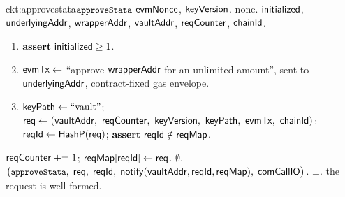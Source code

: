 \begin{CktBox}{ckt:approvestata}{$\texttt{\small approveStata}$}
 $\mathsf{evmNonce}$, $\mathsf{keyVersion}$.
 none.
 $\mathsf{initialized}$, $\mathsf{underlyingAddr}$, $\mathsf{wrapperAddr}$, $\mathsf{vaultAddr}$, $\mathsf{reqCounter}$, $\mathsf{chainId}$.
\begin{enumerate}[nosep,leftmargin=1.7em,topsep=2pt]
\item $\textbf{assert}~ \mathsf{initialized} \geq 1$.
\item $\mathsf{evmTx} \gets$ ``approve $\mathsf{wrapperAddr}$ for an unlimited amount'', sent to $\mathsf{underlyingAddr}$,
      contract-fixed gas envelope.
\item $\mathsf{keyPath} \gets \text{``vault''}$; \;
      $\req \gets (\vaultAddr\bc \sigNonce\bc \keyVer\bc \keyPath\bc \evmTxOf\bc \chainId)$; \;
      $\mathsf{reqId} \gets \mathsf{HashP}(\mathsf{req})$; \; $\textbf{assert}~ \mathsf{reqId} \notin \mathsf{reqMap}$.
\end{enumerate}
\begin{OutList}
\oitem{\Dvault} $\mathsf{reqCounter} \mathrel{+}= 1$; \; $\mathsf{reqMap}[\mathsf{reqId}] \gets \mathsf{req}$.
\oitem{\Dshd} $\emptyset$.
\oitem{\stmt} $\bigl(\texttt{\small approveStata},\; \mathsf{req},\; \mathsf{reqId},\; \mathsf{notify}(\mathsf{vaultAddr}, \mathsf{reqId}, \mathsf{reqMap}),\;
  \mathsf{comCallIO}\bigr)$.
\oitem{\wit} $\bot$.
\oitem{\Rel} the request is well formed.
\end{OutList}
\end{CktBox}


